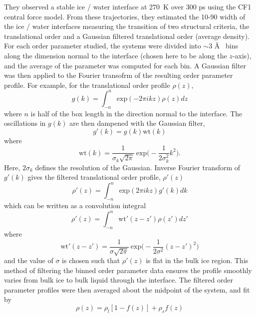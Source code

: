 They observed a stable ice / water interface at 270~K over 300 ps
using the CF1 central force model. From these trajectories, they
estimated the 10-90 width of the ice / water interfaces measuring the
transition of two structural criteria, the translational order and a
Gaussian filtered translational order (average density). For each order
parameter studied, the systems were divided into $\sim$3 \AA~ bins
along the dimension normal to the interface (chosen here to be along
the $z$-axis), and the average of the parameter was computed for each
bin. A Gaussian filter was then applied to the Fourier transofrm of
the resulting order parameter profile. For example, for the
translational order profile $\rho (z)$,
\begin{equation}
g(k) = \int_{-n}^{n} \mathrm{exp}(-2\pi ikz)\rho (z)dz
\end{equation}
where $n$ is half of the box length in the direction normal to the
interface. The oscillations in $g(k)$ are then dampened with the
Gaussian filter,
\begin{equation}
g'(k) = g(k)\mathrm{wt}(k)
\end{equation}
where 
\begin{equation}
\mathrm{wt}(k)=\frac{1}{\sigma_{k}\sqrt{2\pi }}~\mathrm{exp}\Bigg(-\frac{1}{2\sigma_{k}^{2}}k^{2}\Bigg).
\end{equation}
Here, $2\sigma_{k}$ defines the resolution of the Gaussian. Inverse
Fourier transform of $g'(k)$ gives the filtered translational order
profile, $\rho '(z)$
\begin{equation}
\rho '(z) = \int_{-n}^{n} \mathrm{exp}(2\pi ikz)g'(k)dk
\end{equation}
which can be written as a convolution integral
\begin{equation}
\rho '(z) = \int_{-n}^{n} \mathrm{wt}'(z-z')\rho (z')dz'
\end{equation}
where
\begin{equation}
\mathrm{wt}'(z-z') = \frac{1}{\sigma
  \sqrt{2\pi}}~\mathrm{exp}\Bigg(-\frac{1}{2\sigma^{2}}(z-z')^{2}\Bigg)
\end{equation}
and the value of $\sigma$ is chosen such that $\rho '(z)$ is flat in
the bulk ice region. This method of filtering the binned order
parameter data ensures the profile smoothly varies from bulk ice to
bulk liquid through the interface.  The filtered order parameter
profiles were then averaged about the midpoint of the system, and fit
by
\begin{equation}
\rho (z) = \rho_{l}[1-f(z)]+\rho_{s}f(z)
\end{equation}
